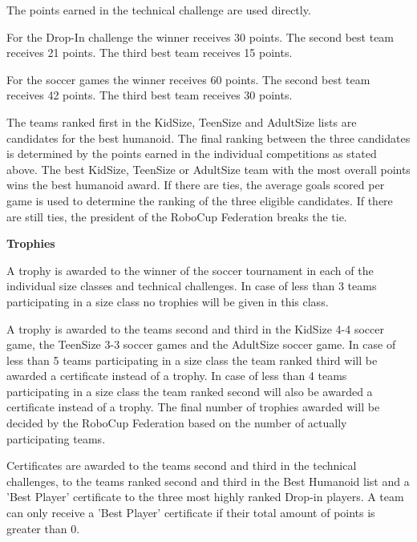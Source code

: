 \bigskip

The points earned in the technical challenge are used directly.

\bigskip

For the Drop-In challenge the winner receives 30 points. The second best team receives 21 points. The third best team receives 15 points.


\bigskip

For the soccer games the winner receives 60 points. The second best team receives 42 points. The third best team receives 30 points.

\bigskip

The teams ranked first in the KidSize, TeenSize and AdultSize lists are candidates for the best humanoid. The final ranking between the three candidates is determined by the points earned in the individual competitions as stated above. The best KidSize, TeenSize or AdultSize team with the most overall points wins the best humanoid award. If there are ties, the average goals scored per game is used to determine the ranking of the three eligible candidates. If there are still ties, the president of the RoboCup Federation breaks the tie.

\bigskip

{\bfseries Trophies}

\headlinebox

A trophy is awarded to the winner of the soccer tournament in each of the individual size classes and technical challenges. In case of less than 3 teams participating in a size class no trophies will be given in this class.

\bigskip

A trophy is awarded to the teams second and third in the KidSize 4-4 soccer game, the TeenSize 3-3 soccer games and the AdultSize   soccer game. In case of less than 5 teams participating in a size class the team ranked third will be awarded a certificate instead of a trophy. In case of less than 4 teams participating in a size class the team ranked second will also be awarded a certificate instead of a trophy. The final number of trophies awarded will be decided by the RoboCup Federation based on the number of actually participating teams.

\bigskip

Certificates are awarded to the teams second and third in the technical challenges, to the teams ranked second and third in the Best Humanoid list and a 'Best Player' certificate to the three most highly ranked Drop-in players. A team can only receive a 'Best Player' certificate if their total amount of points is greater than 0.

